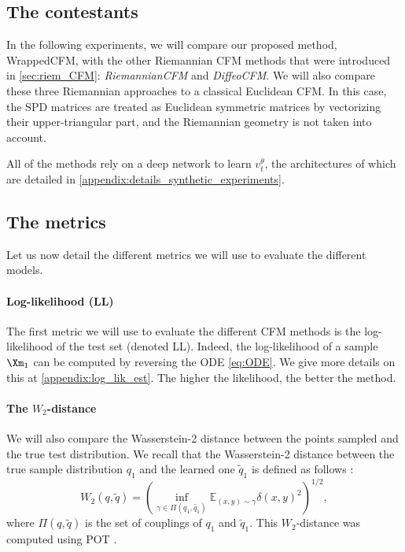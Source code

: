 \documentclass[10pt]{article} %
\theoremstyle{plain}
\theoremstyle{definition}
\theoremstyle{remark}
\begin{document}
\subsection{The contestants}
\label{sec:contestants}
In the following experiments, we will compare our proposed method, WrappedCFM, with the other Riemannian CFM methods that were introduced in \cref{sec:riem_CFM}: \emph{RiemannianCFM} and \emph{DiffeoCFM}. We will also compare these three Riemannian approaches to a classical Euclidean CFM. In this case, the SPD matrices are treated as Euclidean symmetric matrices by vectorizing their upper-triangular part, and the Riemannian geometry is not taken into account.

All of the methods rely on a deep network to learn $v_t^\theta$, the architectures of which are detailed in \cref{appendix:details_synthetic_experiments}.
\subsection{The metrics}
\label{sec:metrics}
Let us now detail the different metrics we will use to evaluate the different models.

\paragraph{Log-likelihood (LL)} The first metric we will use to evaluate the different CFM methods is the log-likelihood of the test set (denoted LL). Indeed, the log-likelihood of a sample $\Xm_1$ can be computed by reversing the ODE \cref{eq:ODE}. We give more details on this at \cref{appendix:log_lik_est}. The higher the likelihood, the better the method. %
\paragraph{The $W_2$-distance}
We will also compare the Wasserstein-2 distance between the points sampled and the true test distribution. We recall that the Wasserstein-2 distance between the true sample distribution $q_1$ and the learned one $\tilde{q}_1$ is defined as follows \citep{peyreComputationalOptimalTransport2020}:
$$W_2(q, \tilde{q}) = \left( \inf_{\gamma \in \Pi(q_1, \tilde{q_1})}\mathbb{E}_{(x,y) \sim \gamma}\delta(x,y)^2\right)^{1/2},$$
where $\Pi(q, \tilde{q})$ is the set of couplings of $q_1$ and $\tilde{q}_1$. This $W_2$-distance was computed using POT \citep{flamary2024pot}.
\end{document}
